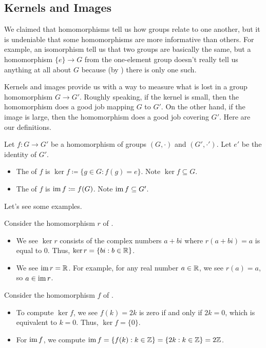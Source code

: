 \documentclass[../main.tex]{subfiles}
\begin{document}
\subsection{Kernels and Images}
We claimed that homomorphisms tell us how groups relate to one another, but it is undeniable that some homomorphisms are more informative than others. For example, an isomorphism tell us that two groups are basically the same, but a homomorphism $\{e\}\to G$ from the one-element group doesn't really tell us anything at all about $G$ because (by ) there is only one such.

Kernels and images provide us with a way to measure what is lost in a group homomorphism $G\to G'$. Roughly speaking, if the kernel is small, then the homomorphism does a good job mapping $G$ to $G'$. On the other hand, if the image is large, then the homomorphism does a good job covering $G'$. Here are our definitions.
\begin{definition}
    Let $f\colon G\to G'$ be a homomorphism of groups $(G,\cdot)$ and $(G',\cdot')$. Let $e'$ be the identity of $G'$.
    \begin{itemize}
        \item The  of $f$ is $\ker f\coloneqq\{g\in G:f(g)=e\}$. Note $\ker f\subseteq G$.
        \item The  of $f$ is $\operatorname{im} f\coloneqq f(G)$. Note $\operatorname{im} f\subseteq G'$.
    \end{itemize}
\end{definition}
Let's see some examples.
\begin{example} \label{ex:real-part-ker-im}
    Consider the homomorphism $r$ of .
    \begin{itemize}
        \item We see $\ker r$ consists of the complex numbers $a+bi$ where $r(a+bi)=a$ is equal to $0$. Thus, $\ker r=\{bi:b\in\mathbb R\}$.
        \item We see $\operatorname{im} r=\mathbb R$. For example, for any real number $a\in\mathbb R$, we see $r(a)=a$, so $a\in\operatorname{im} r$.
    \end{itemize}
\end{example}
\begin{example}
    Consider the homomorphism $f$ of .
    \begin{itemize}
        \item To compute $\ker f$, we see $f(k)=2k$ is zero if and only if $2k=0$, which is equivalent to $k=0$. Thus, $\ker f=\{0\}$.
        \item For $\operatorname{im} f$, we compute $\operatorname{im} f=\{f(k):k\in\mathbb Z\}=\{2k:k\in\mathbb Z\}=2\mathbb Z$.
    \end{itemize}
\end{example}
\end{document}
